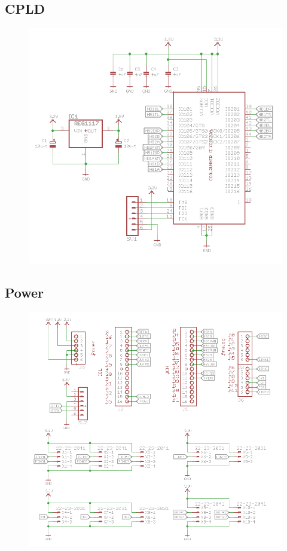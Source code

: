\subsection{CPLD}
\begin{figure}[!ht]
	\centering
	\includegraphics[width=1\textwidth]{figures/CPLD.PNG}
	\caption{}
	\label{Hardware diagram}
\end{figure}
\newpage
\subsection{Power}
\begin{figure}[!ht]
	\centering
	\includegraphics[width=1\textwidth]{figures/connectors.PNG}
	\caption{}
	\label{Hardware diagram}
\end{figure}
\newpage
